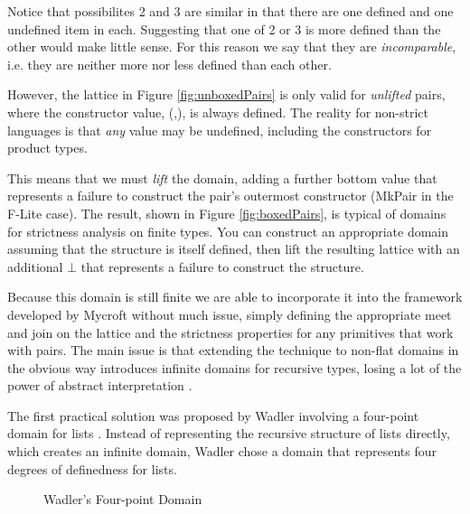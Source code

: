 Notice that possibilites 2 and 3 are similar in that there are one defined and
one undefined item in each. Suggesting that one of 2 or 3 is more defined than
the other would make little sense.  For this reason we say that they are
\emph{incomparable}, i.e. they are neither more nor less defined than each
other.

However, the lattice in Figure \ref{fig:unboxedPairs} is only valid for
\emph{unlifted} pairs, where the constructor value, \<(,)\>, is always defined.
The reality for non-strict languages is that \emph{any} value may be undefined,
including the constructors for product types.

This means that we must \emph{lift} the domain, adding a further bottom value
that represents a failure to construct the pair's outermost constructor
(\<MkPair\> in the F-Lite case). The result, shown in Figure
\ref{fig:boxedPairs}, is typical of domains for strictness analysis on finite
types. You can construct an appropriate domain assuming that the structure is
itself defined, then lift the resulting lattice with an additional $\bot$ that
represents a failure to construct the structure.

Because this domain is still finite we are able to incorporate it into the
framework developed by Mycroft without much issue, simply defining the
appropriate \<meet\> and \<join\> on the lattice and the strictness properties
for any primitives that work with pairs. The main issue is that extending the
technique to non-flat domains in the obvious way introduces infinite domains
for recursive types, losing a lot of the power of abstract interpretation
.

The first practical solution was proposed by Wadler involving a four-point
domain for lists \citep{wadler1987strictness}. Instead of representing the
recursive structure of lists directly, which creates an infinite domain, Wadler
chose a domain that represents four degrees of definedness for lists.

\begin{figure}[t]
\centering
{}
\caption{Wadler's Four-point Domain}
\label{fig:listDomain}
\end{figure}

